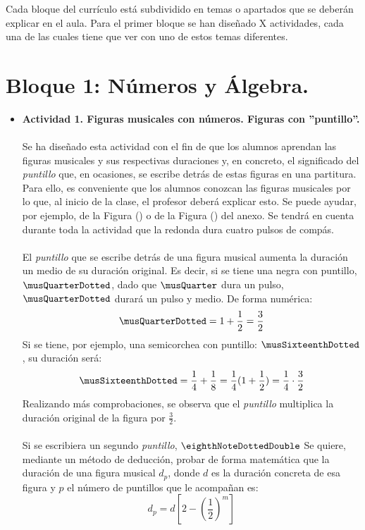 \documentclass[a4paper, openright, 11pt, titlepage]{report}
\theoremstyle{definition}\newtheorem{defin}[propo]{Definition}
\theoremstyle{definition}\newtheorem{obser}[propo]{Remark}
\theoremstyle{definition}\newtheorem{ejem}[propo]{Ejemplo}
\theoremstyle{definition}\newtheorem{algoritmo}[propo]{Algoritmo}
\begin{document}
Cada bloque del currículo está subdividido en temas o apartados que se deberán explicar en el aula. Para el primer bloque se han diseñado X actividades, cada una de las cuales tiene que ver con uno de estos temas diferentes.
\section{Bloque 1: Números y Álgebra.}
\begin{itemize}
    \item \textbf{Actividad 1. Figuras musicales con números. Figuras con ''puntillo''.}\\\\
    Se ha diseñado esta actividad con el fin de que los alumnos aprendan las figuras musicales y sus respectivas duraciones y, en concreto, el significado del \textit{puntillo} que, en ocasiones, se escribe detrás de estas figuras en una partitura.\\
    Para ello, es conveniente que los alumnos conozcan las figuras musicales por lo que, al inicio de la clase, el profesor deberá explicar esto. Se puede ayudar, por ejemplo, de la Figura () o de la Figura () del anexo. Se tendrá en cuenta durante toda la actividad que la redonda dura cuatro pulsos de compás.\\\\
    El \textit{puntillo} que se escribe detrás de una figura musical aumenta la duración un medio de su duración original. Es decir, si se tiene una negra con puntillo, $\musQuarterDotted$, dado que $\musQuarter$ dura un pulso, $\musQuarterDotted$ durará un pulso y medio. De forma numérica: $$\musQuarterDotted = 1 + \frac{1}{2} = \frac{3}{2}$$
    Si se tiene, por ejemplo, una semicorchea con puntillo: $\musSixteenthDotted$, su duración será: $$\musSixteenthDotted = \frac{1}{4} + \frac{1}{8} = \frac{1}{4}(1 + \frac{1}{2}) = \frac{1}{4}\cdot\frac{3}{2}$$
    Realizando más comprobaciones, se observa que el \textit{puntillo} multiplica la duración original de la figura por $\frac{3}{2}$.\\\\
    Si se escribiera un segundo \textit{puntillo}, $\eighthNoteDottedDouble$
    Se quiere, mediante un método de deducción, probar de forma matemática que la duración de una figura musical $d_{p}$, donde $d$ es la duración concreta de esa figura y $p$ el número de puntillos que le acompañan es: $$d_{p} = d[2-(\frac{1}{2})^{m}]$$


\end{itemize}
\end{document}
